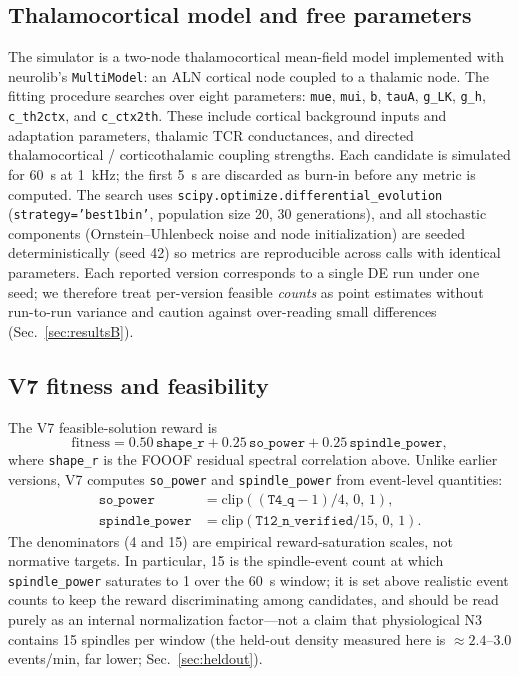 \documentclass[conference]{IEEEtran}
\newcommand{\code}[1]{\texttt{#1}}
\begin{document}
\subsection{Thalamocortical model and free parameters}
The simulator is a two-node thalamocortical mean-field model implemented with
neurolib's \code{MultiModel}: an ALN cortical node coupled to a thalamic node.
The fitting procedure searches over eight parameters: \code{mue}, \code{mui},
\code{b}, \code{tauA}, \code{g\_LK}, \code{g\_h}, \code{c\_th2ctx}, and
\code{c\_ctx2th}. These include cortical background inputs and adaptation
parameters, thalamic TCR conductances, and directed thalamocortical /
corticothalamic coupling strengths. Each candidate is simulated for 60~s at
1~kHz; the first 5~s are discarded as burn-in before any metric is computed.
The search uses \code{scipy.optimize.differential\_evolution}
(\code{strategy='best1bin'}, population size 20, 30 generations), and all
stochastic components (Ornstein--Uhlenbeck noise and node initialization) are
seeded deterministically (seed 42) so metrics are reproducible across calls
with identical parameters. Each reported version corresponds to a single DE run
under one seed; we therefore treat per-version feasible \emph{counts} as point
estimates without run-to-run variance and caution against over-reading small
differences (Sec.~\ref{sec:resultsB}).

\subsection{V7 fitness and feasibility}
The V7 feasible-solution reward is
\begin{equation}
\text{fitness} = 0.50\,\code{shape\_r} + 0.25\,\code{so\_power}
+ 0.25\,\code{spindle\_power},
\end{equation}
where \code{shape\_r} is the FOOOF residual spectral correlation above. Unlike
earlier versions, V7 computes \code{so\_power} and \code{spindle\_power} from
event-level quantities:
\begin{align}
\code{so\_power} &= \mathrm{clip}\!\left((\code{T4\_q}-1)/4,\,0,\,1\right),\\
\code{spindle\_power} &= \mathrm{clip}\!\left(\code{T12\_n\_verified}/15,\,0,\,1\right).
\end{align}
The denominators (4 and 15) are empirical reward-saturation scales, not
normative targets. In particular, 15 is the spindle-event count at which
\code{spindle\_power} saturates to 1 over the 60~s window; it is set above
realistic event counts to keep the reward discriminating among candidates, and
should be read purely as an internal normalization factor---not a claim that
physiological N3 contains 15 spindles per window (the held-out density measured
here is $\approx 2.4$--$3.0$ events/min, far lower;
Sec.~\ref{sec:heldout}).
\end{document}
